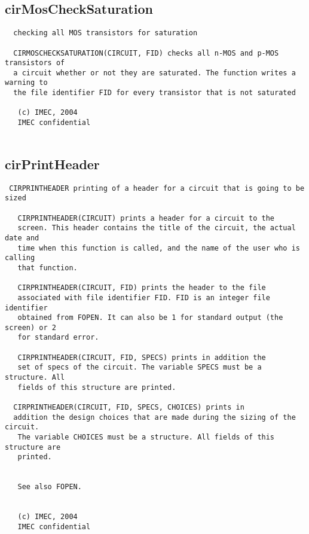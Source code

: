 \newpage
\subsection{cirMosCheckSaturation}
\label{sec:cirMosCheckSaturation}
\begin{verbatim}
  checking all MOS transistors for saturation
 
  CIRMOSCHECKSATURATION(CIRCUIT, FID) checks all n-MOS and p-MOS transistors of
  a circuit whether or not they are saturated. The function writes a warning to
  the file identifier FID for every transistor that is not saturated
 
   (c) IMEC, 2004
   IMEC confidential 
 

\end{verbatim}

\newpage
\subsection{cirPrintHeader}
\label{sec:cirPrintHeader}
\begin{verbatim}
 CIRPRINTHEADER printing of a header for a circuit that is going to be sized
 
   CIRPRINTHEADER(CIRCUIT) prints a header for a circuit to the
   screen. This header contains the title of the circuit, the actual date and
   time when this function is called, and the name of the user who is calling
   that function.
   
   CIRPRINTHEADER(CIRCUIT, FID) prints the header to the file
   associated with file identifier FID. FID is an integer file identifier
   obtained from FOPEN. It can also be 1 for standard output (the screen) or 2
   for standard error.
 
   CIRPRINTHEADER(CIRCUIT, FID, SPECS) prints in addition the
   set of specs of the circuit. The variable SPECS must be a structure. All
   fields of this structure are printed.
 
  CIRPRINTHEADER(CIRCUIT, FID, SPECS, CHOICES) prints in
  addition the design choices that are made during the sizing of the circuit. 
   The variable CHOICES must be a structure. All fields of this structure are
   printed. 
 
 
   See also FOPEN.
 
 
   (c) IMEC, 2004
   IMEC confidential 
 

\end{verbatim}

